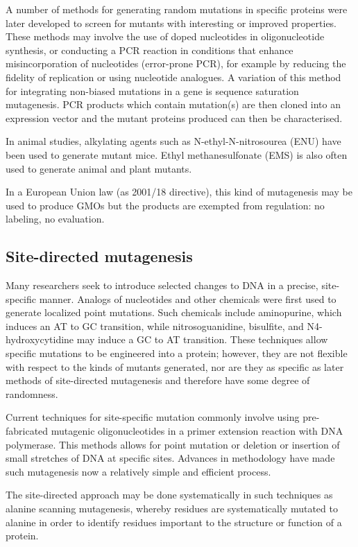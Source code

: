 A number of methods for generating random mutations in specific proteins were later developed to screen for mutants with interesting or improved properties. These methods may involve the use of doped nucleotides in oligonucleotide synthesis, or conducting a PCR reaction in conditions that enhance misincorporation of nucleotides (error-prone PCR), for example by reducing the fidelity of replication or using nucleotide analogues. A variation of this method for integrating non-biased mutations in a gene is sequence saturation mutagenesis. PCR products which contain mutation(s) are then cloned into an expression vector and the mutant proteins produced can then be characterised.

In animal studies, alkylating agents such as N-ethyl-N-nitrosourea (ENU) have been used to generate mutant mice. Ethyl methanesulfonate (EMS) is also often used to generate animal and plant mutants.

In a European Union law (as 2001/18 directive), this kind of mutagenesis may be used to produce GMOs but the products are exempted from regulation: no labeling, no evaluation.

\hypertarget{site-directed-mutagenesis}{%
\subsection{Site-directed mutagenesis}\label{site-directed-mutagenesis}}

Many researchers seek to introduce selected changes to DNA in a precise, site-specific manner. Analogs of nucleotides and other chemicals were first used to generate localized point mutations. Such chemicals include aminopurine, which induces an AT to GC transition, while nitrosoguanidine, bisulfite, and N4-hydroxycytidine may induce a GC to AT transition. These techniques allow specific mutations to be engineered into a protein; however, they are not flexible with respect to the kinds of mutants generated, nor are they as specific as later methods of site-directed mutagenesis and therefore have some degree of randomness.

Current techniques for site-specific mutation commonly involve using pre-fabricated mutagenic oligonucleotides in a primer extension reaction with DNA polymerase. This methods allows for point mutation or deletion or insertion of small stretches of DNA at specific sites. Advances in methodology have made such mutagenesis now a relatively simple and efficient process.

The site-directed approach may be done systematically in such techniques as alanine scanning mutagenesis, whereby residues are systematically mutated to alanine in order to identify residues important to the structure or function of a protein.

